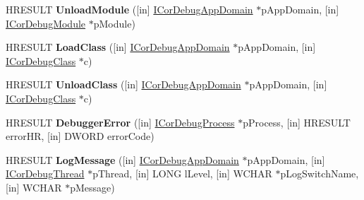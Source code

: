 \begin{DoxyCompactItemize}
\item 
\mbox{\label{interface_i_cor_debug_managed_callback_a2dd8adc3fa04350e9d45e842adb995b4}} 
H\+R\+E\+S\+U\+LT {\bfseries Unload\+Module} (\mbox{[}in\mbox{]} \hyperlink{interface_i_cor_debug_app_domain}{I\+Cor\+Debug\+App\+Domain} $\ast$p\+App\+Domain, \mbox{[}in\mbox{]} \hyperlink{interface_i_cor_debug_module}{I\+Cor\+Debug\+Module} $\ast$p\+Module)
\item 
\mbox{\label{interface_i_cor_debug_managed_callback_a8430152367eabb61187d817dfb2c0b5a}} 
H\+R\+E\+S\+U\+LT {\bfseries Load\+Class} (\mbox{[}in\mbox{]} \hyperlink{interface_i_cor_debug_app_domain}{I\+Cor\+Debug\+App\+Domain} $\ast$p\+App\+Domain, \mbox{[}in\mbox{]} \hyperlink{interface_i_cor_debug_class}{I\+Cor\+Debug\+Class} $\ast$c)
\item 
\mbox{\label{interface_i_cor_debug_managed_callback_af2ddcf787c1484f8ea72d5dab2c23715}} 
H\+R\+E\+S\+U\+LT {\bfseries Unload\+Class} (\mbox{[}in\mbox{]} \hyperlink{interface_i_cor_debug_app_domain}{I\+Cor\+Debug\+App\+Domain} $\ast$p\+App\+Domain, \mbox{[}in\mbox{]} \hyperlink{interface_i_cor_debug_class}{I\+Cor\+Debug\+Class} $\ast$c)
\item 
\mbox{\label{interface_i_cor_debug_managed_callback_a10ad76d35d401b3f01957d3da9da9a00}} 
H\+R\+E\+S\+U\+LT {\bfseries Debugger\+Error} (\mbox{[}in\mbox{]} \hyperlink{interface_i_cor_debug_process}{I\+Cor\+Debug\+Process} $\ast$p\+Process, \mbox{[}in\mbox{]} H\+R\+E\+S\+U\+LT error\+HR, \mbox{[}in\mbox{]} D\+W\+O\+RD error\+Code)
\item 
\mbox{\label{interface_i_cor_debug_managed_callback_a4f75091045692b9ce7d9a9f4e70f241c}} 
H\+R\+E\+S\+U\+LT {\bfseries Log\+Message} (\mbox{[}in\mbox{]} \hyperlink{interface_i_cor_debug_app_domain}{I\+Cor\+Debug\+App\+Domain} $\ast$p\+App\+Domain, \mbox{[}in\mbox{]} \hyperlink{interface_i_cor_debug_thread}{I\+Cor\+Debug\+Thread} $\ast$p\+Thread, \mbox{[}in\mbox{]} L\+O\+NG l\+Level, \mbox{[}in\mbox{]} W\+C\+H\+AR $\ast$p\+Log\+Switch\+Name, \mbox{[}in\mbox{]} W\+C\+H\+AR $\ast$p\+Message)
\item 
\mbox{\label{interface_i_cor_debug_managed_callback_af838fc7f6502c50578b8185941314c0d}} 

\end{DoxyCompactItemize}
